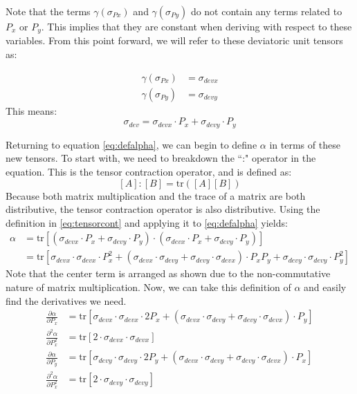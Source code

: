 Note that the terms $\gamma(\sigma_{Px})$ and $\gamma(\sigma_{Py})$ do not contain any terms related to $P_x$ or $P_y$. This implies that they are constant when deriving with respect to these variables. From this point forward, we will refer to these deviatoric unit tensors as:

   \begin{align*}
	   \gamma(\sigma_{Px}) &= \sigma_{devx}\\
	   \gamma(\sigma_{Py}) &= \sigma_{devy}
   \end{align*}
This means: 
   \begin{equation}
	   \sigma_{dev} = \sigma_{devx} \cdot P_x + \sigma_{devy} \cdot P_y
   \end{equation}

Returning to equation \ref{eq:defalpha}, we can begin to define $\alpha$ in terms of these new tensors. To start with, we need to breakdown the ``:" operator in the equation. This is the tensor contraction operator, and is defined as: 
   \begin{equation}
	   \left[A\right] : \left[B\right] = \mathrm{tr}(\left[A\right]\left[B\right])
	   \label{eq:tensorcont}
   \end{equation}
Because both matrix multiplication and the trace of a matrix are both distributive, the tensor contraction operator is also distributive. Using the definition in \ref{eq:tensorcont} and applying it to \ref{eq:defalpha} yields: 
   \begin{align}
	   \alpha &= \mathrm{tr}\left[(\sigma_{devx} \cdot P_x + \sigma_{devy} \cdot P_y) \cdot
		    (\sigma_{devx} \cdot P_x + \sigma_{devy} \cdot P_y)\right]\nonumber\\
		  &= \mathrm{tr}\left[\sigma_{devx} \cdot \sigma_{devx} \cdot P_x^2 + \left( 
		     \sigma_{devx} \cdot \sigma_{devy} + \sigma_{devy} \cdot \sigma_{devx} \right) \cdot P_x P_y + 
		     \sigma_{devy} \cdot \sigma_{devy} \cdot P_y^2 \right]
   \end{align}
Note that the center term is arranged as shown due to the non-commutative nature of matrix multiplication.
Now, we can take this definition of $\alpha$ and easily find the derivatives we need.
   \begin{align}
	   \frac{\partial \alpha}{\partial P_x} &= 
	   	\mathrm{tr}\left[\sigma_{devx} \cdot \sigma_{devx} \cdot 2P_x + \left( 
		     \sigma_{devx} \cdot \sigma_{devy} + \sigma_{devy} \cdot \sigma_{devx} \right) \cdot P_y \right]\label{eq:fd_ax}\\
	   \frac{\partial^2 \alpha}{\partial P_x^2} &=
	   	\mathrm{tr}\left[2 \cdot \sigma_{devx} \cdot \sigma_{devx} \right]\\
	   \frac{\partial \alpha}{\partial P_y} &= 
	   	\mathrm{tr}\left[\sigma_{devy} \cdot \sigma_{devy} \cdot 2P_y + \left( 
		     \sigma_{devx} \cdot \sigma_{devy} + \sigma_{devy} \cdot \sigma_{devx} \right) \cdot P_x \right]\\
	   \frac{\partial^2 \alpha}{\partial P_x^2} &=
		\mathrm{tr}\left[2 \cdot \sigma_{devy} \cdot \sigma_{devy} \right]\label{eq:sd_ay}
   \end{align}

